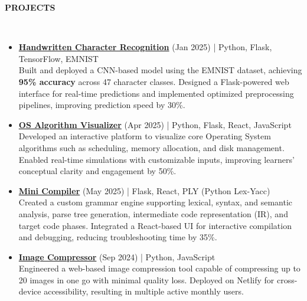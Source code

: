 \documentclass[a4paper,10pt]{article}
\newcommand{\lsep}{-0.5cm}
\newcommand{\resheading}[1]{{\small \colorbox{mygrey}{\begin{minipage}{0.975\textwidth}{\textbf{#1 \vphantom{p\^{E}}}}\end{minipage}}}}
\begin{document}
\resheading{\textbf{PROJECTS} }\\[\lsep]
\begin{itemize}
\setlength\itemsep{0.5em}

\item \textbf{\href{https://github.com/VinodPandey14/Handwritten-Character-Recognition}{Handwritten Character Recognition}} (Jan 2025) | Python, Flask, TensorFlow, EMNIST \\
Built and deployed a CNN-based model using the EMNIST dataset, achieving \textbf{95\% accuracy} across 47 character classes. Designed a Flask-powered web interface for real-time predictions and implemented optimized preprocessing pipelines, improving prediction speed by 30\%.

\item \textbf{\href{https://os-algo.netlify.app/}{OS Algorithm Visualizer}} (Apr 2025) | Python, Flask, React, JavaScript \\
Developed an interactive platform to visualize core Operating System algorithms such as scheduling, memory allocation, and disk management. Enabled real-time simulations with customizable inputs, improving learners’ conceptual clarity and engagement by 50\%.

\item \textbf{\href{https://mini-compiler.netlify.app/}{Mini Compiler}} (May 2025) | Flask, React, PLY (Python Lex-Yacc) \\
Created a custom grammar engine supporting lexical, syntax, and semantic analysis, parse tree generation, intermediate code representation (IR), and target code phases. Integrated a React-based UI for interactive compilation and debugging, reducing troubleshooting time by 35\%.

\item \textbf{\href{https://compress-img.netlify.app/}{Image Compressor}} (Sep 2024) | Python, JavaScript \\
Engineered a web-based image compression tool capable of compressing up to 20 images in one go with minimal quality loss. Deployed on Netlify for cross-device accessibility, resulting in multiple active monthly users.
\end{itemize}
\end{document}

